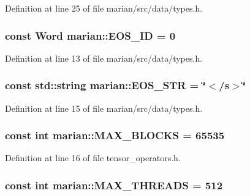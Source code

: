Definition at line 25 of file marian/src/data/types.\+h.

\subsubsection[{\texorpdfstring{E\+O\+S\+\_\+\+ID}{EOS_ID}}]{\setlength{\rightskip}{0pt plus 5cm}const {\bf Word} marian\+::\+E\+O\+S\+\_\+\+ID = 0}\hypertarget{namespacemarian_a58eb44c6e8969831f40ee27feeed33ed}{}\label{namespacemarian_a58eb44c6e8969831f40ee27feeed33ed}


Definition at line 13 of file marian/src/data/types.\+h.

\subsubsection[{\texorpdfstring{E\+O\+S\+\_\+\+S\+TR}{EOS_STR}}]{\setlength{\rightskip}{0pt plus 5cm}const std\+::string marian\+::\+E\+O\+S\+\_\+\+S\+TR = \char`\"{}$<$/s$>$\char`\"{}}\hypertarget{namespacemarian_ae9a4ff3b7d4df0a6ea4a710810c5b6f6}{}\label{namespacemarian_ae9a4ff3b7d4df0a6ea4a710810c5b6f6}


Definition at line 15 of file marian/src/data/types.\+h.

\subsubsection[{\texorpdfstring{M\+A\+X\+\_\+\+B\+L\+O\+C\+KS}{MAX_BLOCKS}}]{\setlength{\rightskip}{0pt plus 5cm}const int marian\+::\+M\+A\+X\+\_\+\+B\+L\+O\+C\+KS = 65535}\hypertarget{namespacemarian_a596290b68dad437e90054f558f7d2d83}{}\label{namespacemarian_a596290b68dad437e90054f558f7d2d83}


Definition at line 16 of file tensor\+\_\+operators.\+h.

\subsubsection[{\texorpdfstring{M\+A\+X\+\_\+\+T\+H\+R\+E\+A\+DS}{MAX_THREADS}}]{\setlength{\rightskip}{0pt plus 5cm}const int marian\+::\+M\+A\+X\+\_\+\+T\+H\+R\+E\+A\+DS = 512}\hypertarget{namespacemarian_ac3c48e15e9e2d80e8028b1688190a9e7}{}\label{namespacemarian_ac3c48e15e9e2d80e8028b1688190a9e7}


